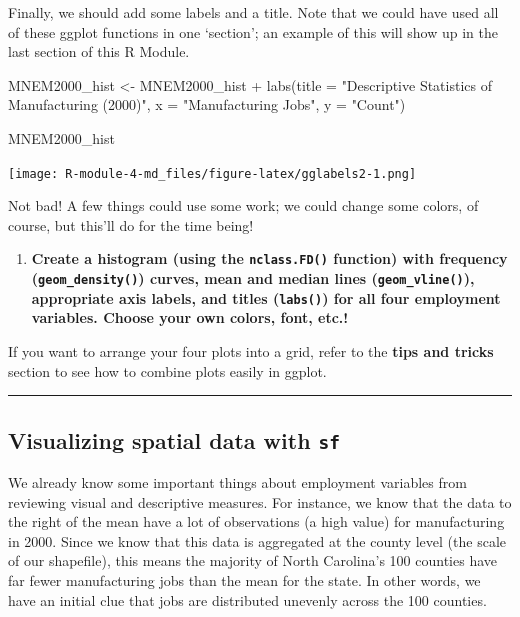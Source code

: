 \documentclass[
]{article}
\newenvironment{Shaded}{\begin{snugshade}}{\end{snugshade}}
\newcommand{\AttributeTok}[1]{\textcolor[rgb]{0.77,0.63,0.00}{#1}}
\newcommand{\FunctionTok}[1]{\textcolor[rgb]{0.00,0.00,0.00}{#1}}
\newcommand{\NormalTok}[1]{#1}
\newcommand{\OtherTok}[1]{\textcolor[rgb]{0.56,0.35,0.01}{#1}}
\newcommand{\SpecialCharTok}[1]{\textcolor[rgb]{0.00,0.00,0.00}{#1}}
\newcommand{\StringTok}[1]{\textcolor[rgb]{0.31,0.60,0.02}{#1}}
\providecommand{\tightlist}{%
  \setlength{\itemsep}{0pt}\setlength{\parskip}{0pt}}
\begin{document}
Finally, we should add some labels and a title. Note that we could have
used all of these ggplot functions in one `section'; an example of this
will show up in the last section of this R Module.

\begin{Shaded}
\begin{Highlighting}[]
\NormalTok{MNEM2000\_hist }\OtherTok{\textless{}{-}}\NormalTok{ MNEM2000\_hist }\SpecialCharTok{+} 
  \FunctionTok{labs}\NormalTok{(}\AttributeTok{title =} \StringTok{"Descriptive Statistics of Manufacturing (2000)"}\NormalTok{,}
       \AttributeTok{x =} \StringTok{"Manufacturing Jobs"}\NormalTok{,}
       \AttributeTok{y =} \StringTok{"Count"}\NormalTok{)}

\NormalTok{MNEM2000\_hist}
\end{Highlighting}
\end{Shaded}

\texttt{[image: R-module-4-md\_files/figure-latex/gglabels2-1.png]}

Not bad! A few things could use some work; we could change some colors,
of course, but this'll do for the time being!

\begin{enumerate}
\def\labelenumi{\arabic{enumi}.}
\tightlist
\item
  \textbf{Create a histogram (using the \texttt{nclass.FD()} function)
  with frequency (\texttt{geom\_density()}) curves, mean and median
  lines (\texttt{geom\_vline()}), appropriate axis labels, and titles
  (\texttt{labs()}) for all four employment variables. Choose your own
  colors, font, etc.!}
\end{enumerate}

If you want to arrange your four plots into a grid, refer to the
\textbf{tips and tricks} section to see how to combine plots easily in
ggplot.

\begin{center}\rule{0.5\linewidth}{0.5pt}\end{center}

\pagebreak

\hypertarget{visualizing-spatial-data-with-sf}{%
\subsection{\texorpdfstring{Visualizing spatial data with
\texttt{sf}}{Visualizing spatial data with sf}}\label{visualizing-spatial-data-with-sf}}

We already know some important things about employment variables from
reviewing visual and descriptive measures. For instance, we know that
the data to the right of the mean have a lot of observations (a high
value) for manufacturing in 2000. Since we know that this data is
aggregated at the county level (the scale of our shapefile), this means
the majority of North Carolina's 100 counties have far fewer
manufacturing jobs than the mean for the state. In other words, we have
an initial clue that jobs are distributed unevenly across the 100
counties.
\end{document}
